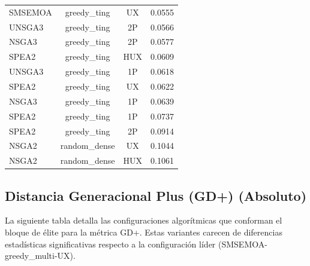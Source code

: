 \begin{longtable}{lccc}
SMSEMOA & greedy\_ting & UX & 0.0555 \\
UNSGA3 & greedy\_ting & 2P & 0.0566 \\
NSGA3 & greedy\_ting & 2P & 0.0577 \\
SPEA2 & greedy\_ting & HUX & 0.0609 \\
UNSGA3 & greedy\_ting & 1P & 0.0618 \\
SPEA2 & greedy\_ting & UX & 0.0622 \\
NSGA3 & greedy\_ting & 1P & 0.0639 \\
SPEA2 & greedy\_ting & 1P & 0.0737 \\
SPEA2 & greedy\_ting & 2P & 0.0914 \\
NSGA2 & random\_dense & UX & 0.1044 \\
NSGA2 & random\_dense & HUX & 0.1061 \\
\end{longtable}

\subsection{Distancia Generacional Plus (GD+) (Absoluto)}\label{anexo:elite_gd}

La siguiente tabla detalla las configuraciones algorítmicas que conforman el bloque de élite para la métrica GD+. Estas variantes carecen de diferencias estadísticas significativas respecto a la configuración líder (SMSEMOA-greedy\_multi-UX).

